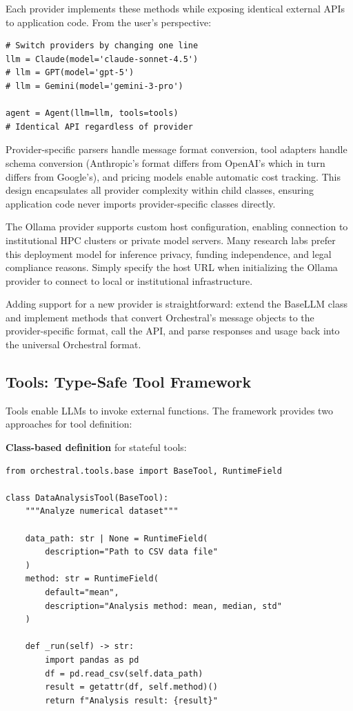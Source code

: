 \documentclass{article}
\begin{document}
Each provider implements these methods while exposing identical external APIs to application code. From the user's perspective:

\begin{verbatim}
# Switch providers by changing one line
llm = Claude(model='claude-sonnet-4.5')
# llm = GPT(model='gpt-5')
# llm = Gemini(model='gemini-3-pro')

agent = Agent(llm=llm, tools=tools)
# Identical API regardless of provider
\end{verbatim}

Provider-specific parsers handle message format conversion, tool adapters handle schema conversion (Anthropic's format differs from OpenAI's which in turn differs from Google's), and pricing models enable automatic cost tracking. This design encapsulates all provider complexity within child classes, ensuring application code never imports provider-specific classes directly.

The Ollama provider supports custom host configuration, enabling connection to institutional HPC clusters or private model servers. Many research labs prefer this deployment model for inference privacy, funding independence, and legal compliance reasons. Simply specify the host URL when initializing the Ollama provider to connect to local or institutional infrastructure.

Adding support for a new provider is straightforward: extend the BaseLLM class and implement methods that convert Orchestral's message objects to the provider-specific format, call the API, and parse responses and usage back into the universal Orchestral format.

\subsection{Tools: Type-Safe Tool Framework}

Tools enable LLMs to invoke external functions. The framework provides two approaches for tool definition:

\textbf{Class-based definition} for stateful tools:

\begin{verbatim}
from orchestral.tools.base import BaseTool, RuntimeField

class DataAnalysisTool(BaseTool):
    """Analyze numerical dataset"""

    data_path: str | None = RuntimeField(
        description="Path to CSV data file"
    )
    method: str = RuntimeField(
        default="mean",
        description="Analysis method: mean, median, std"
    )

    def _run(self) -> str:
        import pandas as pd
        df = pd.read_csv(self.data_path)
        result = getattr(df, self.method)()
        return f"Analysis result: {result}"
\end{verbatim}
\end{document}
